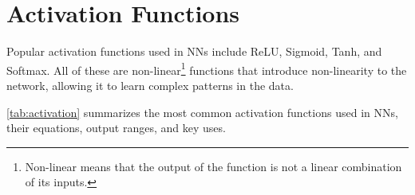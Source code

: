 \documentclass[oneside,11pt,dvipsnames]{book}
\numberwithin{equation}{section}
\theoremstyle{definition}
\theoremstyle{remark}
\begin{document}

\section{Activation Functions}\label{sec:activation}
Popular activation functions used in NNs include ReLU, Sigmoid, Tanh, and Softmax. All of these are non-linear\footnote{Non-linear means that the output of the function is not a linear combination of its inputs.} functions that introduce non-linearity to the network, allowing it to learn complex patterns in the data.

\autoref{tab:activation} summarizes the most common activation functions used in NNs, their equations, output ranges, and key uses.
\end{document}
